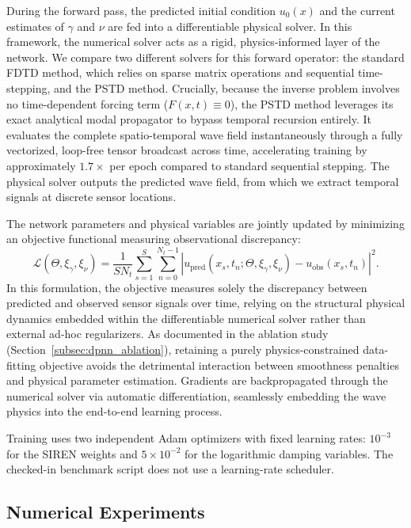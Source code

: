\documentclass{Configuration_Files/PoliMi3i_thesis}
\newif\ifshowthesischanges
\DeclareRobustCommand{\thesischange}[2]{%
    \ifshowthesischanges
        \textcolor{#1}{#2}%
    \else
        #2%
    \fi
}
\def\thesischange#1#2{#2}%
\begin{document}
\thesischange{red}{During the forward pass, the predicted initial condition $u_0(x)$ and the current estimates of $\gamma$ and $\nu$ are fed into a differentiable physical solver. In this framework, the numerical solver acts as a rigid, physics-informed layer of the network. We compare two different solvers for this forward operator: the standard FDTD method, which relies on sparse matrix operations and sequential time-stepping, and the PSTD method. Crucially, because the inverse problem involves no time-dependent forcing term ($F(x,t) \equiv 0$), the PSTD method leverages its exact analytical modal propagator to bypass temporal recursion entirely. It evaluates the complete spatio-temporal wave field instantaneously through a fully vectorized, loop-free tensor broadcast across time, accelerating training by approximately $1.7\times$ per epoch compared to standard sequential stepping. The physical solver outputs the predicted wave field, from which we extract temporal signals at discrete sensor locations.}

\thesischange{red}{The network parameters and physical variables are jointly updated by minimizing an objective functional measuring observational discrepancy:
\begin{equation}
\label{eq:dpnn_loss}
\mathcal{L}(\Theta, \xi_\gamma, \xi_\nu) = \frac{1}{S N_t} \sum_{s=1}^{S}\sum_{n=0}^{N_t-1} \left| u_{\mathrm{pred}}(x_s, t_n; \Theta, \xi_\gamma, \xi_\nu) - u_{\mathrm{obs}}(x_s, t_n) \right|^2.
\end{equation}
In this formulation, the objective measures solely the discrepancy between predicted and observed sensor signals over time, relying on the structural physical dynamics embedded within the differentiable numerical solver rather than external ad-hoc regularizers. As documented in the ablation study (Section~\ref{subsec:dpnn_ablation}), retaining a purely physics-constrained data-fitting objective avoids the detrimental interaction between smoothness penalties and physical parameter estimation. Gradients are backpropagated through the numerical solver via automatic differentiation, seamlessly embedding the wave physics into the end-to-end learning process.}

\thesischange{red}{Training uses two independent Adam optimizers with fixed learning rates: $10^{-3}$ for the SIREN weights and $5\times10^{-2}$ for the logarithmic damping variables. The checked-in benchmark script does not use a learning-rate scheduler.}

\subsection{\thesischange{red}{Numerical Experiments}}
\label{subsec:dpnn_experiments}
\end{document}
